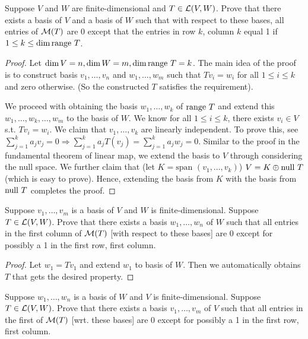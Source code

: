 \documentclass{extarticle}
\begin{document}
\begin{problem}{5}
    Suppose \(V\) and \(W\) are finite-dimensional and \(T \in \mathcal{L}(V, W)\). Prove that 
    there exists a basis of \(V\) and a basis of \(W\) such that with respect to these bases, 
    all entries of \(\mathcal{M}(T)\) are 0 except that the entries in row \(k\), column \(k\) equal 1 
    if \(1 \leq k \leq \dim \text{range } T\). 
\end{problem}

\begin{proof}
Let \(\dim V = n, \dim W = m, \dim \text{range } T = k\). The main idea of the proof is to construct 
basis \(v_1, \ldots, v_n\) and \(w_1, \ldots, w_m\) such that \(Tv_i = w_i\) for all \(1 \leq i \leq k\)
and zero otherwise. (So the constructed \(T\) satisfies the requirement). 

We proceed with obtaining the basis \(w_1, \ldots, w_k\) of \(\text{range } T\) and extend this 
\(w_1, \ldots, w_k, \ldots, w_m\) to the basis of \(W\). We know for all \(1 \leq i \leq k\),
there exists \(v_i \in V\) s.t. \(T v_i = w_i\). We claim that \(v_1, \ldots, v_k\) are linearly 
independent. To prove this, see \(\sum_{j=1}^{k}a_j v_j = 0 \Rightarrow \sum_{j=1}^{k}a_jT(v_j)
= \sum_{j=1}^{k}a_j w_j = 0\). Similar to the proof in the fundamental theorem of linear map, 
we extend the basis to \(V\) through considering the null space. We further claim that 
(let \(K = \text{span }(v_1, \ldots, v_k)\)) \(V = K \oplus \text{null } T\) (which is easy to prove). Hence, 
extending the basis from \(K\) with the basis from \(\text{null } T\) completes the proof.  
\end{proof}

\begin{problem}{6}
    Suppose \(v_1, \ldots, v_m\) is a basis of \(V\) and \(W\) is finite-dimensional. Suppose 
    \(T \in \mathcal{L}(V, W)\). Prove that there exists a basis \(w_1, \ldots, w_n\) of \(W\) such 
    that all entries in the first column of \(\mathcal{M}(T)\) [with respect to these bases] are 0 
    except for possibly a 1 in the first row, first column. 
\end{problem}

\begin{proof}
Let \(w_1 = T v_1\) and extend \(w_1\) to basis of \(W\). Then we automatically obtains \(T\) 
that gets the desired property. 
\end{proof}

\begin{problem}{7}
    Suppose \(w_1, \ldots, w_n\) is a basis of \(W\) and \(V\) is finite-dimensional. Suppose 
    \(T \in \mathcal{L}(V, W)\). Prove that there exists a basis \(v_1, \ldots, v_m\) of \(V\) such 
    that all entries in the first of \(\mathcal{M}(T)\) [wrt. these bases] are 0 except for possibly 
    a 1 in the first row, first column. 
\end{problem}
\end{document}
